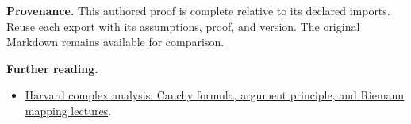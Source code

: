 \documentclass[preprint,12pt,aps,pra,showkeys,amsmath,amssymb,superscriptaddress,floatfix]{revtex4-2}
\theoremstyle{definition}
\theoremstyle{remark}
\providecommand{\tightlist}{\setlength{\itemsep}{2pt}\setlength{\parskip}{0pt}}
\begin{document}
\par\medskip\begingroup\small\linespread{1.0}\selectfont\noindent\textbf{Provenance.} This authored proof is complete relative to its declared imports. Reuse
each export with its assumptions, proof, and version. The original
Markdown remains available for comparison.
\par\endgroup

\par\smallskip\begingroup\small\linespread{1.0}\selectfont\noindent\textbf{Further reading.} \begin{itemize}
\tightlist
\item
  \href{https://people.math.harvard.edu/~siu/math113/}{Harvard complex
  analysis: Cauchy formula, argument principle, and Riemann mapping
  lectures}.
\end{itemize}\par\endgroup
\end{document}
